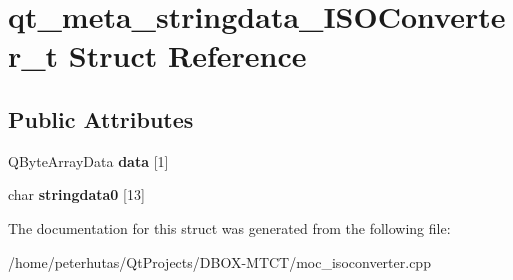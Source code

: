 \hypertarget{structqt__meta__stringdata___i_s_o_converter__t}{}\section{qt\+\_\+meta\+\_\+stringdata\+\_\+\+I\+S\+O\+Converter\+\_\+t Struct Reference}
\label{structqt__meta__stringdata___i_s_o_converter__t}
\subsection*{Public Attributes}
\begin{DoxyCompactItemize}
\item 
\mbox{\label{structqt__meta__stringdata___i_s_o_converter__t_a7ae50e5b6f5d58fa2d6c7d140c3541e1}} 
Q\+Byte\+Array\+Data {\bfseries data} \mbox{[}1\mbox{]}
\item 
\mbox{\label{structqt__meta__stringdata___i_s_o_converter__t_a57df708cc5e358e90edf4ae6b1ea1ae3}} 
char {\bfseries stringdata0} \mbox{[}13\mbox{]}
\end{DoxyCompactItemize}


The documentation for this struct was generated from the following file\+:\begin{DoxyCompactItemize}
\item 
/home/peterhutas/\+Qt\+Projects/\+D\+B\+O\+X-\/\+M\+T\+C\+T/moc\+\_\+isoconverter.\+cpp\end{DoxyCompactItemize}
